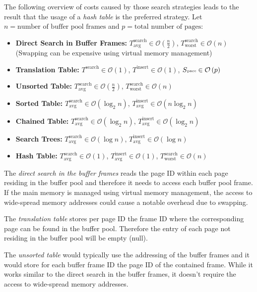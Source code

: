 	The following overview of costs caused by those search strategies leads to the result that the usage of a \emph{hash table} is the preferred strategy. Let $n = \text{number of buffer pool frames}$ and $p = \text{total number of pages}$:
	\begin{itemize}
		\item	\textbf{Direct Search in Buffer Frames:} $T_{\text{avg}}^{\text{search}} \in \mathcal O\left(\frac{n}{2}\right)$, $T_{\text{worst}}^{\text{search}} \in  \mathcal O\left(n\right)$ (Swapping can be expensive using virtual memory management)
		\item	\textbf{Translation Table:} $T^{\text{search}} \in  \mathcal O\left(1\right)$, $T^{\text{insert}} \in  \mathcal O\left(1\right)$, $S\text{\tiny{pace}} \in \mathcal O\left(p\right)$
		\item	\textbf{Unsorted Table:} $T_{\text{avg}}^{\text{search}} \in  \mathcal O\left(\frac{n}{2}\right)$, $T_{\text{worst}}^{\text{search}} \in  \mathcal O\left(n\right)$
		\item	\textbf{Sorted Table:} $T_{\text{avg}}^{\text{search}} \in  \mathcal O\left(\log_2n\right)$, $T_{\text{avg}}^{\text{insert}} \in  \mathcal O\left(n\log_2n\right)$
		\item	\textbf{Chained Table:} $T_{\text{avg}}^{\text{search}} \in  \mathcal O\left(\log_2n\right)$, $T_{\text{avg}}^{\text{insert}} \in  \mathcal O\left(\log_2n\right)$
		\item	\textbf{Search Trees:} $T_{\text{avg}}^{\text{search}} \in  \mathcal O\left(\log n\right)$, $T_{\text{avg}}^{\text{insert}} \in  \mathcal O\left(\log n\right)$
		\item	\textbf{Hash Table:} $T_{\text{avg}}^{\text{search}} \in  \mathcal O\left(1\right)$, $T_{\text{avg}}^{\text{insert}} \in  \mathcal O\left(1\right)$, $T_{\text{worst}}^{\text{search}} \in  \mathcal O\left(n\right)$
	\end{itemize}
	The \emph{direct search in the buffer frames} reads the page ID within each page residing in the buffer pool and therefore it needs to access each buffer pool frame. If the main memory is managed using virtual memory management, the access to wide-spread memory addresses could cause a notable overhead due to swapping.
	
	The \emph{translation table} stores per page ID the frame ID where the corresponding page can be found in the buffer pool. Therefore the entry of each page not residing in the buffer pool will be empty (null).
	
	The \emph{unsorted table} would typically use the addressing of the buffer frames and it would store for each buffer frame ID the page ID of the contained frame. While it works similar to the direct search in the buffer frames, it doesn't require the access to wide-spread memory addresses.

